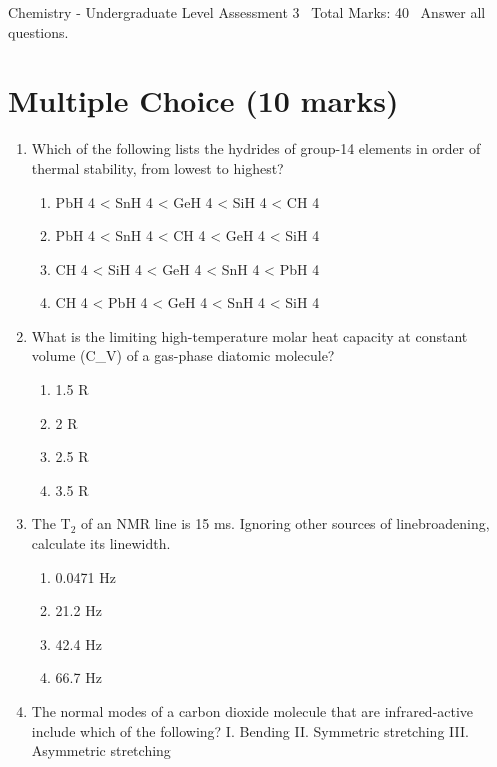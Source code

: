 \documentclass[12pt]{article}
\begin{document}
\begin{center}
Chemistry - Undergraduate Level Assessment 3 \
Total Marks: 40 \
Answer all questions.
\end{center}

\section*{Multiple Choice (10 marks)}
\begin{enumerate}[label=\arabic*.]
\item Which of the following lists the hydrides of group-14 elements in order of thermal stability, from lowest to highest?
\begin{enumerate}[label=(\alph*)]
    \item PbH 4 \textless{} SnH 4 \textless{} GeH 4 \textless{} SiH 4 \textless{} CH 4
    \item PbH 4 \textless{} SnH 4 \textless{} CH 4 \textless{} GeH 4 \textless{} SiH 4
    \item CH 4 \textless{} SiH 4 \textless{} GeH 4 \textless{} SnH 4 \textless{} PbH 4
    \item CH 4 \textless{} PbH 4 \textless{} GeH 4 \textless{} SnH 4 \textless{} SiH 4
\end{enumerate}
\item What is the limiting high-temperature molar heat capacity at constant volume (C\_V) of a gas-phase diatomic molecule?
\begin{enumerate}[label=(\alph*)]
    \item 1.5 R
    \item 2 R
    \item 2.5 R
    \item 3.5 R
\end{enumerate}
\item The T$_{2}$ of an NMR line is 15 ms. Ignoring other sources of linebroadening, calculate its linewidth.
\begin{enumerate}[label=(\alph*)]
    \item 0.0471 Hz
    \item 21.2 Hz
    \item 42.4 Hz
    \item 66.7 Hz
\end{enumerate}
\item The normal modes of a carbon dioxide molecule that are infrared-active include which of the following? I. Bending II. Symmetric stretching III. Asymmetric stretching
\begin{enumerate}[label=(\alph*)]

\end{enumerate}
\end{enumerate}
\end{document}
